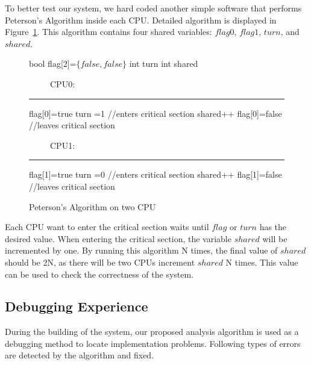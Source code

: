 \documentclass[12pt,frontmatter,copyright,thesis]{usfmanus}
\let\oldnl\nl%
\newcommand{\nonl}{\renewcommand{\nl}{\let\nl\oldnl}}%
\newcommand{\rememberlines}{\xdef\rememberedlines{\number\value{AlgoLine}}}
\newcommand{\resumenumbering}{\setcounter{AlgoLine}{\rememberedlines}}
\begin{document}
To better 
test our system, we hard coded another simple software that performs Peterson's Algorithm
inside each CPU. Detailed algorithm is displayed in Figure~\ref{petersons}. 
This algorithm contains four shared variables: $flag0$, $flag1$, $turn$, and $shared$.
\begin{figure}[h]
\begin{algorithm}[H]
\DontPrintSemicolon
bool flag[2]=$\{false,false\}$\;
int turn\;
int shared\;
\rememberlines
\end{algorithm}

\begin{minipage}{.5\textwidth}
\begin{algorithm}[H]
\resumenumbering
\DontPrintSemicolon
\nonl \ \ \ \ \ CPU0:\;
\hrule
flag[0]=true\;
turn =1 \;
//enters critical section\;
shared++\;
flag[0]=false\;
//leaves critical section\;

\end{algorithm}
\end{minipage}%
{\LinesNumberedHidden
\begin{minipage}{0.5\textwidth}
\begin{algorithm}[H]
\DontPrintSemicolon
\ \ \ \ \ CPU1:\;
\hrule
flag[1]=true\;
turn =0 \;
//enters critical section\;
shared++\;
flag[1]=false\;
//leaves critical section\;

\end{algorithm}

\end{minipage}
}
\label{petersons}
\caption{Peterson's Algorithm on two CPU}
\end{figure}
Each CPU want to enter the critical section waits until $flag$ or $turn$ has 
the desired value. When entering the critical section, the variable $shared$ will
be incremented by one.
By running this algorithm N times, the final value of $shared$ should
be 2N, as there will be two CPUs increment $shared$ N times. This
value can be used to check the correctness of the system.
\clearpage
\subsection{Debugging Experience}
During the building of the system, our proposed analysis algorithm
is used as a debugging method to locate implementation problems. Following types of errors
are detected by the algorithm and fixed.
\end{document}
